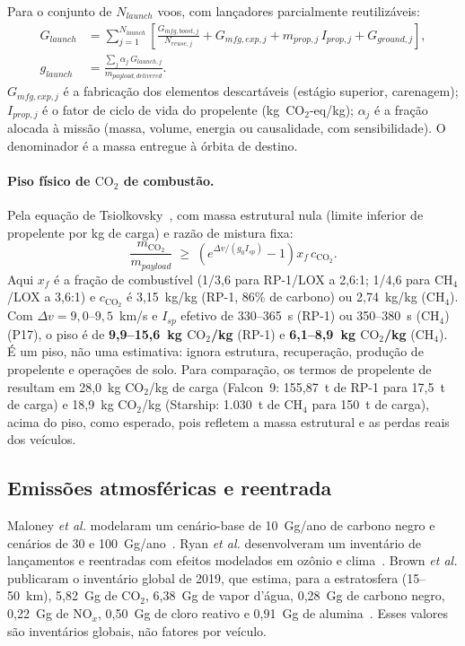 \documentclass[11pt,a4paper]{article}
\newcommand{\CO}{\ensuremath{\mathrm{CO_2}}}
\newcommand{\COeq}{\ensuremath{\mathrm{CO_2}\text{-eq}}}
\begin{document}
Para o conjunto de $N_{launch}$ voos, com lançadores parcialmente reutilizáveis:
\begin{align}
  G_{launch} &= \sum_{j=1}^{N_{launch}}\left[
    \frac{G_{mfg,boost,j}}{N_{reuse,j}}+G_{mfg,exp,j}
    +m_{prop,j}\,I_{prop,j}+G_{ground,j}\right], \label{eq:launch} \\
  g_{launch} &= \frac{\sum_j \alpha_j\,G_{launch,j}}{m_{payload,delivered}}. \label{eq:g_launch}
\end{align}
$G_{mfg,exp,j}$ é a fabricação dos elementos descartáveis (estágio superior,
carenagem); $I_{prop,j}$ é o fator de ciclo de vida do propelente
(kg~$\COeq$/kg); $\alpha_j$ é a fração alocada à missão (massa, volume, energia
ou causalidade, com sensibilidade). O denominador é a massa entregue à órbita
de destino.

\paragraph{Piso físico de $\CO$ de combustão.} Pela equação de
Tsiolkovsky~\cite{r30}, com massa estrutural nula (limite inferior de propelente
por kg de carga) e razão de mistura fixa:
\begin{equation}
  \frac{m_{\CO}}{m_{payload}}\;\ge\;
  \left(e^{\Delta v/(g_0 I_{sp})}-1\right)x_f\,c_{\CO}.
  \label{eq:floor}
\end{equation}
Aqui $x_f$ é a fração de combustível (1/3,6 para RP-1/LOX a 2,6:1; 1/4,6 para
CH$_4$/LOX a 3,6:1) e $c_{\CO}$ é 3,15~kg/kg (RP-1, 86\% de carbono) ou
2,74~kg/kg (CH$_4$). Com $\Delta v=9{,}0$--$9{,}5$~km/s e $I_{sp}$ efetivo de
330--365~s (RP-1) ou 350--380~s (CH$_4$) (P17), o piso é de
\textbf{9,9--15,6~kg $\CO$/kg} (RP-1) e \textbf{6,1--8,9~kg $\CO$/kg}
(CH$_4$). É um piso, não uma estimativa: ignora estrutura, recuperação,
produção de propelente e operações de solo. Para comparação, os termos de
propelente de~\cite{r18} resultam em 28,0~kg $\CO$/kg de carga (Falcon~9:
155,87~t de RP-1 para 17,5~t de carga) e 18,9~kg $\CO$/kg (Starship: 1.030~t de
CH$_4$ para 150~t de carga), acima do piso, como esperado, pois refletem a massa
estrutural e as perdas reais dos veículos.

\subsection{Emissões atmosféricas e reentrada}\label{sec:atm}

Maloney \emph{et al.} modelaram um cenário-base de 10~Gg/ano de carbono negro e
cenários de 30 e 100~Gg/ano~\cite{r13}. Ryan \emph{et al.} desenvolveram um
inventário de lançamentos e reentradas com efeitos modelados em ozônio e
clima~\cite{r14}. Brown \emph{et al.} publicaram o inventário global de 2019,
que estima, para a estratosfera (15--50~km), 5,82~Gg de $\CO$, 6,38~Gg de vapor
d'água, 0,28~Gg de carbono negro, 0,22~Gg de NO$_x$, 0,50~Gg de cloro reativo e
0,91~Gg de alumina~\cite{r15}. Esses valores são inventários globais, não
fatores por veículo.
\end{document}

